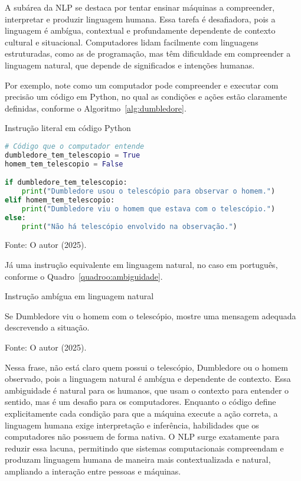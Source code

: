 A subárea da NLP se destaca por tentar ensinar máquinas a compreender, interpretar e produzir linguagem humana. Essa tarefa é desafiadora, pois a linguagem é ambígua, contextual e profundamente dependente de contexto cultural e situacional. Computadores lidam facilmente com linguagens estruturadas, como as de programação, mas têm dificuldade em compreender a linguagem natural, que depende de significados e intenções humanas.

Por exemplo, note como um computador pode compreender e executar com precisão um código em Python, no qual as condições e ações estão claramente definidas, conforme o Algoritmo~\ref{alg:dumbledore}.
\begin{algorithm}[H]
\centering
\caption{Instrução literal em código Python}
\vspace{0.5em}
\begin{lstlisting}[language=Python, style=input]
# Código que o computador entende
dumbledore_tem_telescopio = True
homem_tem_telescopio = False

if dumbledore_tem_telescopio:
    print("Dumbledore usou o telescópio para observar o homem.")
elif homem_tem_telescopio:
    print("Dumbledore viu o homem que estava com o telescópio.")
else:
    print("Não há telescópio envolvido na observação.")
\end{lstlisting}
\caption*{Fonte: O autor (2025).}
\label{alg:dumbledore}
\end{algorithm}

Já uma instrução equivalente em linguagem natural, no caso em português, conforme o Quadro~\ref{quadroo:ambiguidade}.
\begin{quadroo}[H]
\centering
\caption{Instrução ambígua em linguagem natural}
\vspace{0.5em}
\begin{tcolorbox}[
  colback=yellow!20, 
  colframe=black,
  width=0.8\linewidth,   %
  left=0pt,               %
  boxsep=2mm,
  enlarge left by=-0.02\linewidth  %
]
Se Dumbledore viu o homem com o telescópio, mostre uma mensagem adequada descrevendo a situação.
\end{tcolorbox}
\caption*{Fonte: O autor (2025).}
\label{quadroo:ambiguidade}
\end{quadroo}
Nessa frase, não está claro quem possui o telescópio, Dumbledore ou o homem observado, pois a linguagem natural é ambígua e dependente de contexto. Essa ambiguidade é natural para os humanos, que usam o contexto para entender o sentido, mas é um desafio para os computadores.
Enquanto o código define explicitamente cada condição para que a máquina execute a ação correta, a linguagem humana exige interpretação e inferência, habilidades que os computadores não possuem de forma nativa.
O NLP surge exatamente para reduzir essa lacuna, permitindo que sistemas computacionais compreendam e produzam linguagem humana de maneira mais contextualizada e natural, ampliando a interação entre pessoas e máquinas.

